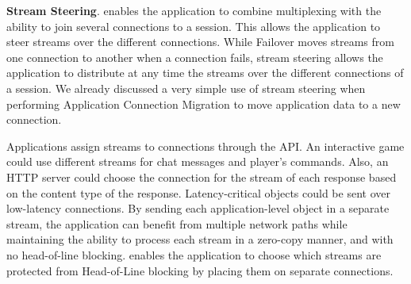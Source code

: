 
\textbf{Stream Steering}. \tcpls enables the application to combine
multiplexing with the ability to join
several \tcp connections to a \tcpls session. This allows the application to
steer \tcpls
streams over the different \tcp connections. While Failover moves
\tcpls streams from one connection to another when a \tcp connection fails, stream
steering allows the application to distribute at any time the streams over the
different
\tcp connections of a \tcpls session. We already discussed a very simple use of
stream steering when performing Application Connection Migration %
to move application data to a new connection.


Applications assign \tcpls streams to \tcp connections through the \tcpls
API.
An interactive game could use different streams for chat messages and player's
commands.  Also, an HTTP server could choose
the \tcp connection for the stream of each response based on the content type of
the response. Latency-critical objects could be sent over
low-latency connections. By sending each application-level object in a separate
stream, the application can benefit from multiple network paths while
maintaining the ability to process each stream in a zero-copy manner, and
with no head-of-line blocking.
\tcpls enables the application to choose which streams are protected from
Head-of-Line blocking by placing them on separate \tcp connections.

